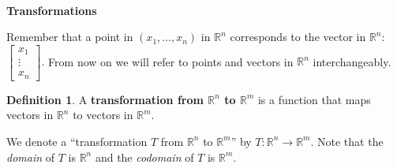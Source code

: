 \documentclass[12pt]{amsart}
\newcommand{\R}{\mathbb{R}}
\theoremstyle{definition}
\newtheorem*{definition}{Definition}
\begin{document}
	
\thispagestyle{fancy}
\pagestyle{fancy}
	
	\
 
\begin{center}
    {\Large \bf {\sc Transformations}}
\end{center}


 Remember that a point in $(x_1,\ldots,x_n)$ in $\R^n$ corresponds to the vector in $\R^n$:
\(
    \left[\begin{array}{c}
         x_1  \\
         \vdots \\
         x_n
    \end{array}\right] .
\)
From now on we will refer to points and vectors in $\R^n$ interchangeably.

\begin{definition}
    A {\bf transformation from $\R^n$ to $\R^m$} is a function that maps vectors in $\R^n$ to vectors in $\R^m$.
\end{definition}

 We denote a ``transformation $T$ from $\R^n$ to $\R^m$'' by $T:\R^n\to\R^m$. Note that the {\it domain} of $T$ is $\R^n$ and the {\it codomain} of $T$ is $\R^m$.
\end{document}
